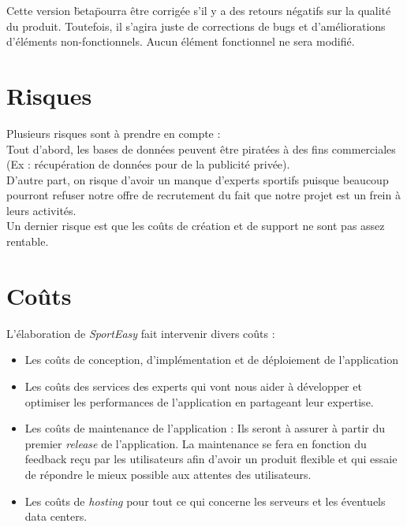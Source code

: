 Cette version \"beta\" pourra être corrigée s'il y a des retours négatifs sur la qualité du produit. Toutefois, il s'agira juste de corrections de bugs et d'améliorations d'éléments non-fonctionnels. Aucun élément fonctionnel ne sera modifié. 

\section{Risques}

Plusieurs risques sont à prendre en compte : \\

Tout d'abord, les bases de données peuvent être piratées à des fins commerciales (Ex : récupération de données pour de la publicité privée).\\

D'autre part, on risque d'avoir un manque d'experts sportifs puisque beaucoup pourront refuser notre offre de recrutement du fait que notre projet est un frein à leurs activités.\\

Un dernier risque est que les coûts de création et de support ne sont pas assez rentable.

\section{Coûts}

L'élaboration de \textit{SportEasy} fait intervenir divers coûts :

\begin{itemize}

\item Les coûts de conception, d'implémentation et de déploiement de l'application

\item Les coûts des services des experts qui vont nous aider à développer et optimiser les performances de l'application en partageant leur expertise.

\item Les coûts de maintenance de l'application : Ils seront à assurer à partir du premier \textit{release} de l'application. La maintenance se fera en fonction du feedback reçu par les utilisateurs afin d'avoir un produit flexible et qui essaie de répondre le mieux possible aux attentes des utilisateurs.

\item Les coûts de \textit{hosting} pour tout ce qui concerne les serveurs et les éventuels data centers.

\end{itemize}

